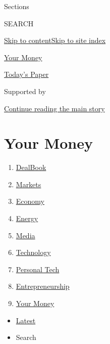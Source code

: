 Sections

SEARCH

\protect\hyperlink{site-content}{Skip to
content}\protect\hyperlink{site-index}{Skip to site index}

\href{https://www.nytimes3xbfgragh.onion/section/your-money}{Your Money}

\href{https://myaccount.nytimes3xbfgragh.onion/auth/login?response_type=cookie\&client_id=vi}{}

\href{https://www.nytimes3xbfgragh.onion/section/todayspaper}{Today's
Paper}

Supported by

\protect\hyperlink{after-sponsor}{Continue reading the main story}

\hypertarget{your-money}{%
\section{Your Money}\label{your-money}}

\begin{enumerate}
\def\labelenumi{\arabic{enumi}.}
\tightlist
\item
  \href{/pages/business/dealbook/index.html}{DealBook}
\item
  \href{https://markets.on.nytimes3xbfgragh.onion}{Markets}
\item
  \href{/section/business/economy}{Economy}
\item
  \href{/section/business/energy-environment}{Energy}
\item
  \href{/section/business/media}{Media}
\item
  \href{/section/technology}{Technology}
\item
  \href{/section/technology/personaltech}{Personal Tech}
\item
  \href{/section/business/smallbusiness}{Entrepreneurship}
\item
  \href{/section/your-money}{Your Money}
\end{enumerate}

\begin{itemize}
\tightlist
\item
  \protect\hyperlink{stream-panel}{Latest}
\item
  Search
\end{itemize}

